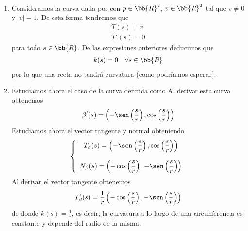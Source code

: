 \begin{ejemplo}\
    \begin{enumerate}
        \item Consideramos la curva dada por 
        con $p\in \bb{R}^2$, $v\in \bb{R}^2$ tal que $v\neq 0$ y $|v| = 1$. De esta forma tendremos que 
        \begin{gather*}
            T(s) = v\\
            T'(s) = 0
        \end{gather*}
        para todo $s\in \bb{R}$. De las expresiones anteriores deducimos que 
        \begin{gather*}
            k(s) = 0\ \ \ \forall s \in \bb{R}
        \end{gather*}
        por lo que una recta no tendrá curvatura (como podríamos esperar).

        \item Estudiamos ahora el caso de la curva definida como
        Al derivar esta curva obtenemos 
        \begin{gather*}
            \beta'(s) = \left(-\sen\left(\frac{s}{r}\right), \cos\left(\frac{s}{r}\right)\right)
        \end{gather*}
        Estudiamos ahora el vector tangente y normal obteniendo
        \begin{gather*}
            \left\{
                \begin{array}{c}
                    T_\beta(s) = \left(-\sen\left(\dfrac{s}{r}\right), \cos\left(\dfrac{s}{r}\right)\right)\\\\
                    N_\beta(s) =  \left(-\cos\left(\dfrac{s}{r}\right), -\sen\left(\dfrac{s}{r}\right)\right)
                \end{array}
            \right.
        \end{gather*}
        Al derivar el vector tangente obtenemos 
        \begin{gather*}
            T_\beta'(s) = \frac{1}{r}\left(-\cos\left(\frac{s}{r}\right), -\sen\left(\frac{s}{r}\right)\right)
        \end{gather*}
        de donde $k(s) = \frac{1}{r}$, es decir, la curvatura a lo largo de una circunferencia es constante y depende del radio de la misma.
    \end{enumerate}
\end{ejemplo}

